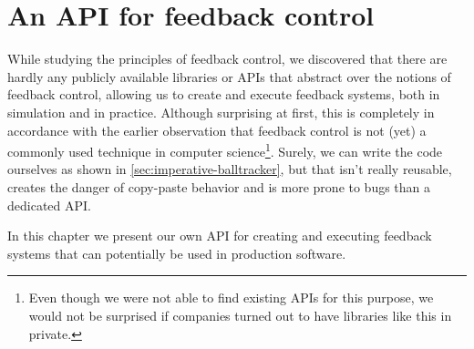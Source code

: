 \chapter{An API for feedback control}

While studying the principles of feedback control, we discovered that there are hardly any publicly available libraries or APIs that abstract over the notions of feedback control, allowing us to create and execute feedback systems, both in simulation and in practice. Although surprising at first, this is completely in accordance with the earlier observation that feedback control is not (yet) a commonly used technique in computer science\footnote{Even though we were not able to find existing APIs for this purpose, we would not be surprised if companies turned out to have libraries like this in private.}. Surely, we can write the code ourselves as shown in \cref{sec:imperative-balltracker}, but that isn't really reusable, creates the danger of copy-paste behavior and is more prone to bugs than a dedicated API.

In this chapter we present our own API for creating and executing feedback systems that can potentially be used in production software. 



































































